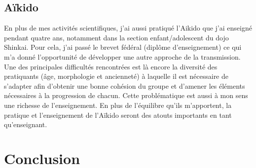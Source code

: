 \documentclass[12pt,a4paper]{article}
\begin{document}
\subsection{Aïkido}

En plus de mes activités scientifiques, j'ai aussi pratiqué l'Aikido que j'ai enseigné pendant quatre ans, notamment dans la section enfant/adolescent du dojo Shinkai.
Pour cela, j'ai passé le brevet fédéral (diplôme d'enseignement) ce qui m'a donné l'opportunité de développer une autre approche de la transmission.
Une des principales difficultés rencontrées est là encore la diversité des pratiquants (âge, morphologie et ancienneté) à laquelle il est nécessaire de s'adapter afin d'obtenir une bonne cohésion du groupe et d'amener les éléments nécessaires à la progression de chacun.
Cette problématique est aussi à mon sens une richesse de l'enseignement.
En plus de l'équilibre qu'ils m'apportent, la pratique et l'enseignement de l'Aïkido seront des atouts importants en tant qu'enseignant.

\section{Conclusion}

%

\nocite{*}

\end{document}
